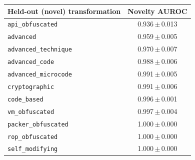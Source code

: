 \begin{tabular}{lc}
\toprule
Held-out (novel) transformation & Novelty AUROC \\
\midrule
\texttt{api\_obfuscated} & 0.936\,$\pm$\,0.013 \\
\texttt{advanced} & 0.959\,$\pm$\,0.005 \\
\texttt{advanced\_technique} & 0.970\,$\pm$\,0.007 \\
\texttt{advanced\_code} & 0.988\,$\pm$\,0.006 \\
\texttt{advanced\_microcode} & 0.991\,$\pm$\,0.005 \\
\texttt{cryptographic} & 0.991\,$\pm$\,0.006 \\
\texttt{code\_based} & 0.996\,$\pm$\,0.001 \\
\texttt{vm\_obfuscated} & 0.997\,$\pm$\,0.004 \\
\texttt{packer\_obfuscated} & 1.000\,$\pm$\,0.000 \\
\texttt{rop\_obfuscated} & 1.000\,$\pm$\,0.000 \\
\texttt{self\_modifying} & 1.000\,$\pm$\,0.000 \\
\bottomrule
\end{tabular}